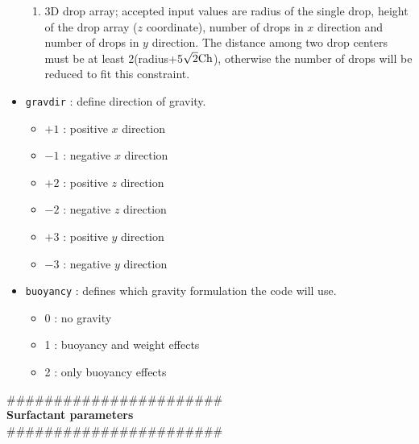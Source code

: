 \begin{itemize}[label={$\circ$}]
\begin{enumerate}
\item 3D drop array; accepted input values are radius of the single drop, height of the drop array ($z$ coordinate), number of drops in $x$ direction and number of drops in $y$ direction. The distance among two drop centers must be at least 2(radius+5$\sqrt{2}\textnormal{Ch}$), otherwise the number of drops will be reduced to fit this constraint.
\end{enumerate}
\item \texttt{gravdir} : define direction of gravity.
\begin{itemize}[label={$\circ$}]
\item $+1$ : positive $x$ direction
\item $-1$ : negative $x$ direction
\item $+2$ : positive $z$ direction
\item $-2$ : negative $z$ direction
\item $+3$ : positive $y$ direction
\item $-3$ : negative $y$ direction
\end{itemize}
\item \texttt{buoyancy} : defines which gravity formulation the code will use.
\begin{itemize}[label={$\circ$}]
\item 0 : no gravity
\item 1 : buoyancy and weight effects
\item 2 : only buoyancy effects
\end{itemize}
\end{itemize}
\#\#\#\#\#\#\#\#\#\#\#\#\#\#\#\#\#\#\#\#\#\#\#\\
{\bf Surfactant parameters}\\
\#\#\#\#\#\#\#\#\#\#\#\#\#\#\#\#\#\#\#\#\#\#\#
